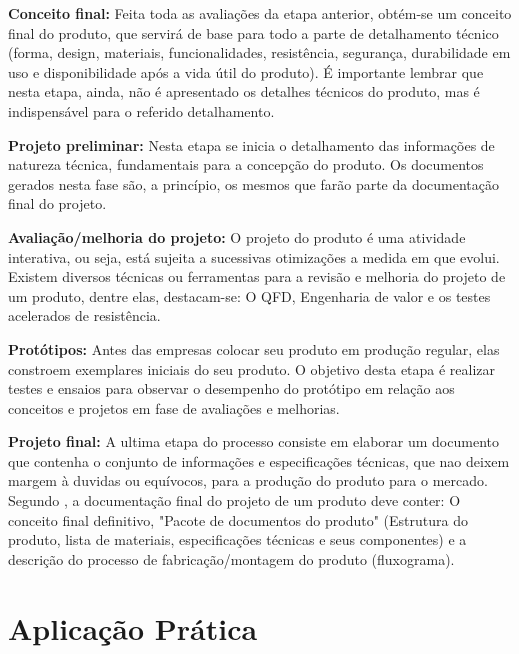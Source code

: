 \textbf{Conceito final:} Feita toda as avaliações da etapa anterior, obtém-se um conceito final do produto, que servirá de base para todo a parte de detalhamento técnico (forma, design, materiais, funcionalidades, resistência, segurança, durabilidade em uso e disponibilidade após a vida útil do produto). É importante lembrar que nesta etapa, ainda, não é apresentado os detalhes técnicos do produto, mas é indispensável para o referido detalhamento.

\textbf{Projeto preliminar:} Nesta etapa se inicia o detalhamento das informações de natureza técnica, fundamentais para a concepção do produto. Os documentos gerados nesta fase são, a princípio, os mesmos que farão parte da documentação final do projeto.

\textbf{Avaliação/melhoria do projeto:} O projeto do produto é uma atividade interativa, ou seja, está sujeita a sucessivas otimizações a medida em que evolui. Existem diversos técnicas ou ferramentas para a revisão e melhoria do projeto de um produto, dentre elas, destacam-se: O \ac{QFD}, Engenharia de valor e os testes acelerados de resistência.

\textbf{Protótipos:} Antes das empresas colocar seu produto em produção regular, elas constroem exemplares iniciais do seu produto. O objetivo desta etapa é realizar testes e ensaios para observar o desempenho do protótipo em relação aos conceitos e projetos em fase de avaliações e melhorias.

\textbf{Projeto final:} A ultima etapa do processo consiste em elaborar um documento que contenha o conjunto de informações e especificações técnicas, que nao deixem margem à duvidas ou equívocos, para a produção do produto para o mercado. Segundo \cite{slack2006administracao}, a documentação final do projeto de um produto deve conter: O conceito final definitivo, "Pacote de documentos do produto" (Estrutura do produto, lista de materiais, especificações técnicas e seus componentes) e a descrição do processo de fabricação/montagem do produto (fluxograma). 


\section{Aplicação Prática} 
\label{sec:projeto_do_produto_aplicacao}